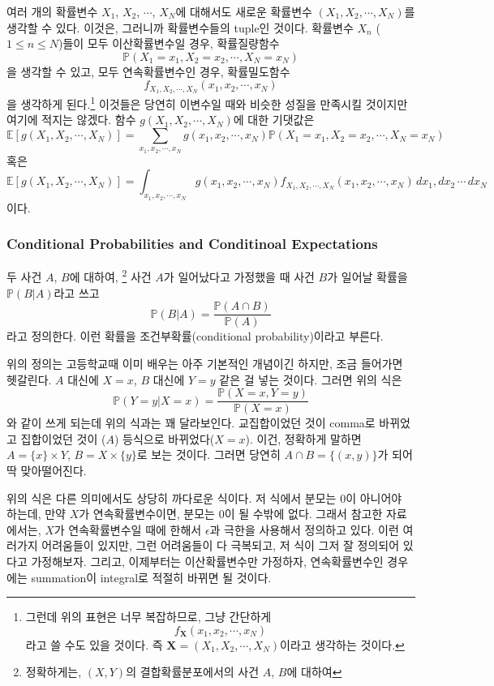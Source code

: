 \documentclass{article}
\begin{document}
여러 개의 확률변수 \(X_1\), \(X_2\), \(\cdots\), \(X_N\)에 대해서도 새로운 확률변수 \((X_1,X_2,\cdots,X_N)\)를 생각할 수 있다.
이것은, 그러니까 확률변수들의 tuple인 것이다.
확률변수 \(X_n\) (\(1\le n\le N\))들이 모두 이산확률변수일 경우, 확률질량함수
\[\mathbb P(X_1=x_1,X_2=x_2,\cdots,X_N=x_N)\]
을 생각할 수 있고, 모두 연속확률변수인 경우, 확률밀도함수
\[f_{X_1,X_2,\cdots,X_N}(x_1,x_2,\cdots,x_N)\]
을 생각하게 된다.\footnote{
그런데 위의 표현은 너무 복잡하므로, 그냥 간단하게
\[f_{\boldsymbol X}(x_1,x_2,\cdots,x_N)\]
라고 쓸 수도 있을 것이다.
즉 \(\boldsymbol X=(X_1,X_2,\cdots,X_N)\)이라고 생각하는 것이다.}
이것들은 당연히 이변수일 때와 비슷한 성질을 만족시킬 것이지만 여기에 적지는 않겠다.
함수 \(g(X_1,X_2,\cdots,X_N)\)에 대한 기댓값은
\[\mathbb E[g(X_1,X_2,\cdots,X_N)]=\sum_{x_1,x_2,\cdots,x_N}g(x_1,x_2,\cdots,x_N)\mathbb P(X_1=x_1,X_2=x_2,\cdots,X_N=x_N)\]
혹은
\[\mathbb E[g(X_1,X_2,\cdots,X_N)]=\int_{x_1,x_2,\cdots,x_N}g(x_1,x_2,\cdots,x_N)f_{X_1,X_2,\cdots,X_N}(x_1,x_2,\cdots,x_N)\,dx_1,dx_2\,\cdots\,dx_N\]
이다.

%
\subsubsection{Conditional Probabilities and Conditinoal Expectations}

두 사건 \(A\), \(B\)에 대하여,
\footnote{정확하게는, \((X,Y)\)의 결합확률분포에서의 사건 \(A\), \(B\)에 대하여}
사건 \(A\)가 일어났다고 가정했을 때 사건 \(B\)가 일어날 확률을 \(\mathbb P(B|A)\)라고 쓰고
\[\mathbb P(B|A)=\frac{\mathbb P(A\cap B)}{\mathbb P(A)}\]
라고 정의한다.
이런 확률을 조건부확률(conditional probability)이라고 부른다.

위의 정의는 고등학교때 이미 배우는 아주 기본적인 개념이긴 하지만, 조금 들어가면 헷갈린다.
\(A\) 대신에 \(X=x\), \(B\) 대신에 \(Y=y\) 같은 걸 넣는 것이다.
그러면 위의 식은
\[\mathbb P(Y=y|X=x)=\frac{\mathbb P(X=x, Y=y)}{\mathbb P(X=x)}\]
와 같이 쓰게 되는데 위의 식과는 꽤 달라보인다.
교집합이었던 것이 comma로 바뀌었고 집합이었던 것이 (\(A\)) 등식으로 바뀌었다(\(X=x\)).
이건, 정확하게 말하면 \(A=\{x\}\times Y\), \(B=X\times\{y\}\)로 보는 것이다.
그러면 당연히 \(A\cap B=\{(x,y)\}\)가 되어 딱 맞아떨어진다.

위의 식은 다른 의미에서도 상당히 까다로운 식이다.
저 식에서 분모는 0이 아니어야 하는데, 만약 \(X\)가 연속확률변수이면, 분모는 0이 될 수밖에 없다.
그래서 참고한 자료에서는, \(X\)가 연속확률변수일 때에 한해서 \(\epsilon\)과 극한을 사용해서 정의하고 있다.
이런 여러가지 어려움들이 있지만, 그런 어려움들이 다 극복되고, 저 식이 그저 잘 정의되어 있다고 가정해보자.
그리고, 이제부터는 이산확률변수만 가정하자, 연속확률변수인 경우에는 summation이 integral로 적절히 바뀌면 될 것이다.
\end{document}
